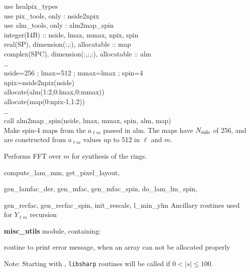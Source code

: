 \begin{example}
{
use healpix\_types \\
use pix\_tools, only : nside2npix \\
use alm\_tools, only : alm2map\_spin \\
integer(I4B) :: nside, lmax, mmax, npix, spin\\
real(SP), dimension(:,:), allocatable :: map \\
complex(SPC), dimension(:,:,:), allocatable :: alm \\
\ldots \\
nside=256 ; lmax=512 ; mmax=lmax ; spin=4\\
npix=nside2npix(nside)\\
allocate(alm(1:2,0:lmax,0:mmax))\\
allocate(map(0:npix-1,1:2))\\
\ldots \\
call alm2map\_spin(nside, lmax, mmax, spin, alm, map)  \\
}
{
Make spin-4 maps from the $a_{\ell m}$ passed in alm. The maps have $N_\mathrm{side}$ of 256, and are constructed from $a_{\ell m}$ values up to 512 in $\ell$ and $m$.
}
\end{example}

\begin{modules}
  \begin{sulist}{} %
  \item[\htmlref{ring\_synthesis}{sub:ring_synthesis}] Performs FFT over $m$ for synthesis of the rings.
  \item[compute\_lam\_mm, get\_pixel\_layout, ]
  \item[gen\_lamfac\_der, gen\_mfac, gen\_mfac\_spin, do\_lam\_lm\_spin, ] 
  \item[gen\_recfac, gen\_recfac\_spin, init\_rescale, l\_min\_ylm] Ancillary routines used
  for $Y_{\ell m}$ recursion
  \item[\textbf{misc\_utils}] module, containing:
  \item[\htmlref{assert\_alloc}{sub:assert}] routine to print error message, when an array can not be
  allocated properly
  \end{sulist}
Note: Starting with , {\tt libsharp} routines will be called if $0<|s|\le100$.
\end{modules}

